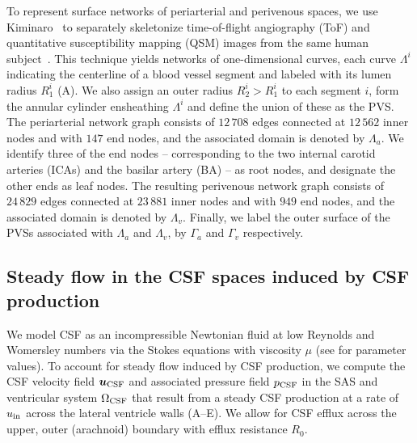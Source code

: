 \documentclass[fleqn,10pt]{wlscirep}
\begin{document}
To represent surface networks of periarterial and perivenous spaces,
we use Kiminaro~\cite{william_silversmith_2021_5539913} to separately
skeletonize time-of-flight angiography (ToF) and quantitative
susceptibility mapping (QSM) images from the same human
subject~\cite{hodneland2019new}. This technique yields networks of
one-dimensional curves, each curve $\Lambda^i$ indicating the
centerline of a blood vessel segment and labeled with its lumen radius
$R_1^i$ (A). We also assign an
outer radius $R_2^i > R_1^i$ to each segment $i$, form the annular
cylinder ensheathing $\Lambda^i$ and define the union of these as the
PVS. The periarterial network graph consists of $12\,708$ edges
connected at $12\,562$ inner nodes and with $147$ end nodes, and the
associated domain is denoted by $\Lambda_a$. We identify three of the
end nodes -- corresponding to the two internal carotid arteries (ICAs)
and the basilar artery (BA) -- as root nodes, and designate the other
ends as leaf nodes. The resulting perivenous network graph consists of
$24\,829$ edges connected at $23\,881$ inner nodes and with $949$ end nodes, and the associated domain is denoted by $\Lambda_v$. Finally, we label the outer surface of the PVSs associated with $\Lambda_a$ and $\Lambda_v$, by $\Gamma_a$ and $\Gamma_v$ respectively.


\subsection*{Steady flow in the CSF spaces induced by CSF production}

We model CSF as an incompressible Newtonian fluid at low Reynolds and
Womersley numbers via the Stokes equations with viscosity $\mu$ (see
 for parameter values). To account for steady
flow induced by CSF production, we compute the CSF velocity field $\bm
u_{\rm CSF}$ and associated pressure field $p_{\rm CSF}$ in the SAS
and ventricular system $\Omega_{\rm CSF}$ that result from a steady
CSF production at a rate of $u_{\rm in}$ across the lateral ventricle
walls (A--E). We allow for CSF efflux across the upper,
outer (arachnoid) boundary with efflux resistance $R_0$.


\end{document}
